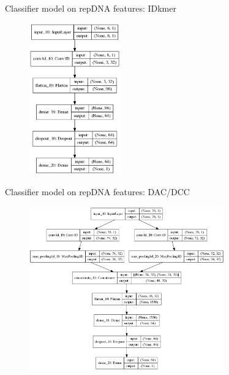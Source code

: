 \documentclass[10pt]{beamer}
\begin{document}
\begin{frame}{Classifier model on repDNA features: IDkmer}
	\begin{figure}[ht]
		\centering
		\includegraphics[width = 0.35\textwidth]{../../models/plotted_models/IDkmer_model.png}
	\end{figure}
\end{frame}

\begin{frame}{Classifier model on repDNA features: DAC/DCC}
	\begin{figure}[ht]
		\centering
		\includegraphics[width = 0.75\textwidth]{../../models/plotted_models/dac_model.png}
	\end{figure}
\end{frame}
\end{document}
